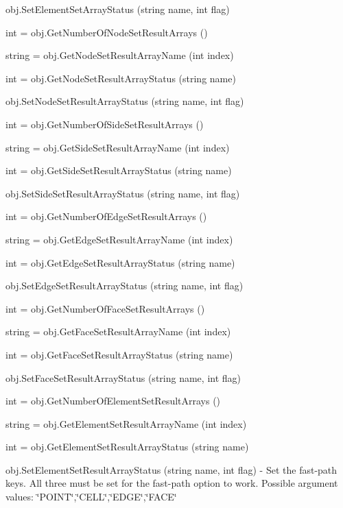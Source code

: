 \begin{DoxyItemize}
\item {\ttfamily obj.\-Set\-Element\-Set\-Array\-Status (string name, int flag)}  
\item {\ttfamily int = obj.\-Get\-Number\-Of\-Node\-Set\-Result\-Arrays ()}  
\item {\ttfamily string = obj.\-Get\-Node\-Set\-Result\-Array\-Name (int index)}  
\item {\ttfamily int = obj.\-Get\-Node\-Set\-Result\-Array\-Status (string name)}  
\item {\ttfamily obj.\-Set\-Node\-Set\-Result\-Array\-Status (string name, int flag)}  
\item {\ttfamily int = obj.\-Get\-Number\-Of\-Side\-Set\-Result\-Arrays ()}  
\item {\ttfamily string = obj.\-Get\-Side\-Set\-Result\-Array\-Name (int index)}  
\item {\ttfamily int = obj.\-Get\-Side\-Set\-Result\-Array\-Status (string name)}  
\item {\ttfamily obj.\-Set\-Side\-Set\-Result\-Array\-Status (string name, int flag)}  
\item {\ttfamily int = obj.\-Get\-Number\-Of\-Edge\-Set\-Result\-Arrays ()}  
\item {\ttfamily string = obj.\-Get\-Edge\-Set\-Result\-Array\-Name (int index)}  
\item {\ttfamily int = obj.\-Get\-Edge\-Set\-Result\-Array\-Status (string name)}  
\item {\ttfamily obj.\-Set\-Edge\-Set\-Result\-Array\-Status (string name, int flag)}  
\item {\ttfamily int = obj.\-Get\-Number\-Of\-Face\-Set\-Result\-Arrays ()}  
\item {\ttfamily string = obj.\-Get\-Face\-Set\-Result\-Array\-Name (int index)}  
\item {\ttfamily int = obj.\-Get\-Face\-Set\-Result\-Array\-Status (string name)}  
\item {\ttfamily obj.\-Set\-Face\-Set\-Result\-Array\-Status (string name, int flag)}  
\item {\ttfamily int = obj.\-Get\-Number\-Of\-Element\-Set\-Result\-Arrays ()}  
\item {\ttfamily string = obj.\-Get\-Element\-Set\-Result\-Array\-Name (int index)}  
\item {\ttfamily int = obj.\-Get\-Element\-Set\-Result\-Array\-Status (string name)}  
\item {\ttfamily obj.\-Set\-Element\-Set\-Result\-Array\-Status (string name, int flag)} -\/ Set the fast-\/path keys. All three must be set for the fast-\/path option to work. Possible argument values\-: \char`\"{}\-P\-O\-I\-N\-T\char`\"{},\char`\"{}\-C\-E\-L\-L\char`\"{},\char`\"{}\-E\-D\-G\-E\char`\"{},\char`\"{}\-F\-A\-C\-E\char`\"{}  

\end{DoxyItemize}
